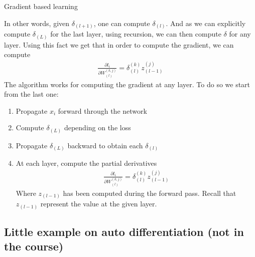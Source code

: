 \begin{parag}{Gradient based learning}
\begin{itemize}
	\end{itemize}
	In other words, given $\delta_{\left(l + 1\right)}$, one can compute $\delta_{\left(l\right)}$. And as we can explicitly compute $\delta_{\left(L\right)}$ for the last layer, using recursion, we can then compute $\delta$ for any layer. Using this fact we get that in order to compute the gradient, we can compute 
	\begin{align*} 
		\frac{\partial l_i}{\partial W_{\left(l\right)}^{\left(k, j\right)}}  = \delta_{\left(l\right)}^{\left(k\right)}z_{\left(l-1\right)}^{\left(j\right)}
	\end{align*}
	The algorithm works for computing the gradient at any layer. To do so we start from the last one:
	\begin{enumerate}
	    \item Propagate $x_i$ forward through the network
	    \item Compute $\delta_{\left(L\right)}$ depending on the loss
	    \item Propagate $\delta_{\left(L\right)}$ backward to obtain each $\delta_{\left(l\right)}$
	    \item At each layer, compute the partial derivatives
			\begin{align*} 
				\frac{\partial l_i}{\partial W_{\left(l\right)}^{\left(k, j\right)}} = \delta_{\left(l\right)}^{\left(k\right)}z_{\left(l - 1\right)}^{\left(j\right)}
			\end{align*}
			Where $z_{\left(l - 1\right)}$ has been computed during the forward pass. Recall that $z_{\left(l - 1\right)}$ represent the value at the given layer.
	\end{enumerate}
	
\end{parag}




\subsection*{Little example on auto differentiation (not in the course)}

